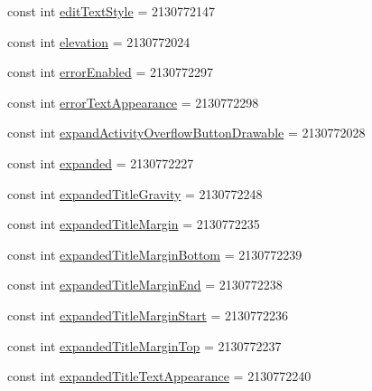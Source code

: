\begin{DoxyCompactItemize}
\item 
const int \mbox{\hyperlink{class_f_w_p_s___app_1_1_droid_1_1_resource_1_1_attribute_a562182849d0baaca64e42a03dd329cc8}{edit\+Text\+Style}} = 2130772147
\item 
const int \mbox{\hyperlink{class_f_w_p_s___app_1_1_droid_1_1_resource_1_1_attribute_ab6e71f346493d89c2d1400c36acdbb46}{elevation}} = 2130772024
\item 
const int \mbox{\hyperlink{class_f_w_p_s___app_1_1_droid_1_1_resource_1_1_attribute_aa6c5e132416f287fbb8a3c4f9501956e}{error\+Enabled}} = 2130772297
\item 
const int \mbox{\hyperlink{class_f_w_p_s___app_1_1_droid_1_1_resource_1_1_attribute_a7baa2724a38a28683046729ebf0ad523}{error\+Text\+Appearance}} = 2130772298
\item 
const int \mbox{\hyperlink{class_f_w_p_s___app_1_1_droid_1_1_resource_1_1_attribute_a5d3fe5ca22cd1d23fd1497a4b1f5ff0a}{expand\+Activity\+Overflow\+Button\+Drawable}} = 2130772028
\item 
const int \mbox{\hyperlink{class_f_w_p_s___app_1_1_droid_1_1_resource_1_1_attribute_a20c45cb84683368b4c5b062f04e05462}{expanded}} = 2130772227
\item 
const int \mbox{\hyperlink{class_f_w_p_s___app_1_1_droid_1_1_resource_1_1_attribute_a689681e7dffe34fdc01fc2b258aa3a37}{expanded\+Title\+Gravity}} = 2130772248
\item 
const int \mbox{\hyperlink{class_f_w_p_s___app_1_1_droid_1_1_resource_1_1_attribute_ab6d134fc4f03de396ce5e432be2be844}{expanded\+Title\+Margin}} = 2130772235
\item 
const int \mbox{\hyperlink{class_f_w_p_s___app_1_1_droid_1_1_resource_1_1_attribute_a7a857b467e60027a46d4b47f40e75805}{expanded\+Title\+Margin\+Bottom}} = 2130772239
\item 
const int \mbox{\hyperlink{class_f_w_p_s___app_1_1_droid_1_1_resource_1_1_attribute_a967627d6f0adac06d0aa48925f68242b}{expanded\+Title\+Margin\+End}} = 2130772238
\item 
const int \mbox{\hyperlink{class_f_w_p_s___app_1_1_droid_1_1_resource_1_1_attribute_a693e34e5951000024af137b840f36392}{expanded\+Title\+Margin\+Start}} = 2130772236
\item 
const int \mbox{\hyperlink{class_f_w_p_s___app_1_1_droid_1_1_resource_1_1_attribute_a5fce69b3124e23d8197601e829348d72}{expanded\+Title\+Margin\+Top}} = 2130772237
\item 
const int \mbox{\hyperlink{class_f_w_p_s___app_1_1_droid_1_1_resource_1_1_attribute_a99836f293b94b6ddc1078e793262f83a}{expanded\+Title\+Text\+Appearance}} = 2130772240

\end{DoxyCompactItemize}
